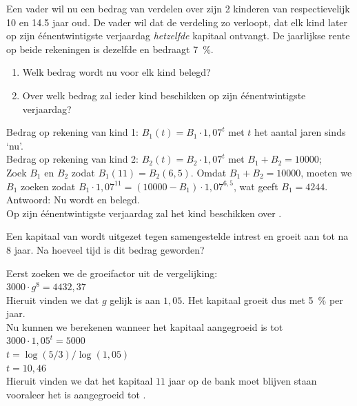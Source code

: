 \begin{oef}
Een vader wil nu een bedrag van  verdelen over zijn
2 kinderen van respectievelijk 10 en \num{14,5} jaar oud. De vader wil
dat de verdeling zo verloopt, dat elk kind later op zijn
\'{e}\'{e}nentwintigste verjaardag \emph{hetzelfde} kapitaal ontvangt.
De jaarlijkse rente op beide rekeningen is dezelfde en bedraagt \SI{7}{\percent}.
\begin{enumerate}
  \item Welk bedrag wordt nu voor elk kind belegd?
  \item Over welk bedrag zal ieder kind beschikken op zijn
        \'e\'enentwintigste verjaardag?
\end{enumerate}
\begin{opl}
Bedrag op rekening van kind 1: $B_1(t)=B_1\cdot 1,07^t$ met $t$ het aantal jaren sinds `nu'.\\
Bedrag op rekening van kind 2: $B_2(t)=B_2\cdot 1,07^t$ met $B_1+B_2=\num{10000}$; \\
Zoek $B_1$ en $B_2$ zodat $B_1(11)=B_2(6,5)$. Omdat $B_1+B_2=\num{10000}$, moeten we $B_1$ zoeken zodat 
$B_1\cdot 1,07^{11}=(10000-B_1)\cdot 1,07^{6,5}$, wat geeft $B_1=4244$. \\
Antwoord: Nu wordt  en  belegd.\\
Op zijn  \'{e}\'{e}nentwintigste verjaardag zal het kind beschikken over .
\end{opl}
\end{oef}

\begin{oef}
Een kapitaal van  wordt uitgezet tegen samengestelde intrest
en groeit aan tot  na 8 jaar. Na hoeveel tijd is dit bedrag  geworden?
\begin{opl}
Eerst zoeken we de groeifactor uit de vergelijking:\\
$3000\cdot g^{8} = 4432,37$\\
Hieruit vinden we dat $g$ gelijk is aan $1,05$. Het kapitaal groeit dus met \SI{5}{\percent} per jaar.\\
Nu kunnen we berekenen wanneer het kapitaal aangegroeid is tot \\
$3000\cdot 1,05^{t} = 5000$\\
$t = \log(5/3)/\log(1,05)$\\
$t = 10,46$\\
Hieruit vinden we dat het kapitaal $11$ jaar op de bank moet blijven staan vooraleer het is aangegroeid tot .
\end{opl}
\end{oef}
  

